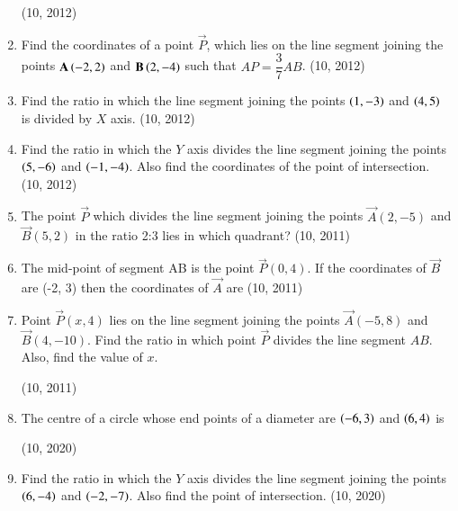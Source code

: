 \begin{enumerate}[label=\thesubsection.\arabic*,ref=\thesubsection.\theenumi]
\hfill (10, 2012)
\item Find the coordinates of a point $\vec{P}$, which lies on the line segment joining the points $\mathbf{A}\left(-2,2\right)$ and $\mathbf{B}\left(2,-4\right)$ such that $AP = \dfrac{3}{7} AB$. 
\hfill (10, 2012)
\item Find the ratio in which the line segment joining the points $\left(1,-3\right)$ and $\left(4,5\right)$ is divided by $X$ axis. 
\hfill (10, 2012)
\item Find the ratio in which the $Y$ axis divides the line segment joining the points $\left(5,-6\right)$ and $\left(-1,-4\right)$. Also find the coordinates of the point of intersection. 
\hfill (10, 2012)
    \item The point $\vec{P}$ which divides the line segment joining the points $\vec{A}(2, - 5)$ and $\vec{B}(5, 2)$ in the ratio 2:3 lies in which quadrant?
\hfill (10, 2011)
    \item The mid-point of segment AB is the point $\vec{P}( 0, 4)$. If the coordinates of $\vec{B}$ are (-2, 3) then the coordinates of $\vec{A}$ are
\hfill (10, 2011)
\item Point $\vec{P}(x, 4)$ lies on the line segment joining the points $\vec{A} (-5,8)$ and $\vec{B} (4, -10)$. Find the ratio in which point $\vec{P}$ divides the line segment $AB$. Also, find the value of $x$.

\hfill (10, 2011)
\item The centre of a circle whose end points of a diameter are $\left(-6,3\right)$ and $\left(6,4\right)$ is

\hfill (10, 2020)
\item Find the ratio in which the $Y$ axis divides the line segment joining the points $\left(6,-4\right)$ and $\left(-2, -7\right)$. Also find the point of intersection.
\hfill (10, 2020)
\end{enumerate}
